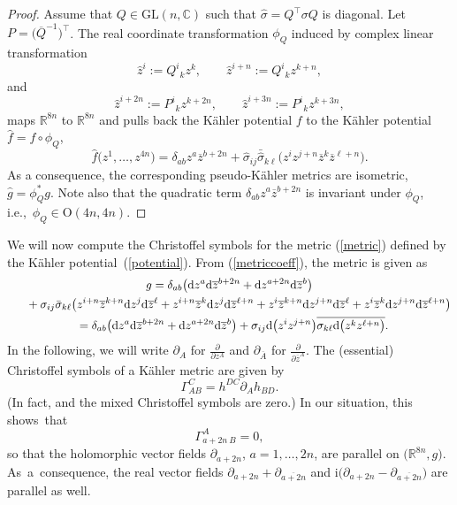 \documentclass[pdftex]{sigma}
\numberwithin{equation}{section}
\newcommand{\C}{\ensuremath{\mathbb{C}}}
\renewcommand{\O}{\ensuremath{\mathrm{O}}}
\newcommand{\GL}{\mathrm{GL}}
\newcommand{\1}{\mathbf{1}}
\renewcommand{\d}{{\mathrm d}}
\newcommand{\ol}{\overline}
\newcommand{\+}{\oplus}
\newcommand{\del}{\partial}
\renewcommand{\=}{\equiv}
\newcommand{\R}{\mathbb{R}}
\begin{document}
\begin{proof}
Assume that $Q\in \GL(n,\C)$ such that $\hat \sigma=Q^\top \sigma Q$ is diagonal. Let $P=\bigl(\overline{Q}^{-1}\bigr)^\top$. The real coordinate transformation $\phi_Q$ induced by complex linear transformation
\[ \hat{z}^{i}:=Q^i{}_k z^{k},\qquad \hat{z}^{i+n}:=Q^i{}_k z^{k+n},\]
and
\[ \hat{z}^{i+2n}:=P^i{}_k z^{k+2n},\qquad {\hat{z}^{i+3n}}:=P^i{}_k z^{k+3n},\]
maps $\R^{8n}$ to $\R^{8n}$ and pulls back the K\"{a}hler potential $f$ to the K\"{a}hler potential $\hat f= f\circ \phi_Q$,
\[
\hat f\bigl({z}^1,\ldots , {z}^{4n}\bigr)
=\delta_{ab} {z}^a\ol{{z}}^{b+2n}+
\hat\sigma_{ij}\bar{\hat\sigma}_{k\ell}
 \bigl(
 {z}^{i}{z}^{j+n}\ol{{z}}^{k} \ol{{z}}^{\ell+n}
 \bigr).
 \]
 As a consequence, the corresponding pseudo-K\"{a}hler metrics are isometric, $\hat g=\phi_Q^*g$. Note also that the quadratic term $\delta_{ab} {z}^a\ol{{z}}^{b+2n}$ is invariant under $\phi_Q$, i.e.,~$\phi_Q\in \O(4n,4n)$.
\end{proof}

We will now compute the Christoffel symbols for the metric (\ref{metric}) defined by the K\"{a}hler potential~(\ref{potential}). From (\ref{metriccoeff}), the metric is given as
\begin{gather}
g =\delta_{ab} \bigl(\d z^a\d \ol{z}^{b+2n} + \d z^{a+2n}\d \ol{z}^{b}\bigr)
\nonumber\\ \hphantom{g=}{}
 +
\sigma_{ij}\bar{\sigma}_{k\ell}
 \bigl(
 z^{i+n}\ol{z}^{k+n}\d z^{j}\d\ol{z}^{\ell}
 +
 z^{i+n}\ol{z}^{k}\d z^{j}\d\ol{z}^{\ell+n}
 +
 z^{i}\ol{z}^{k+n}\d z^{j+n}\d\ol{z}^{\ell}
 +
 z^{i}\ol{z}^{k}\d z^{j+n}\d\ol{z}^{\ell+n}\bigr)
\nonumber\\ \hphantom{g}{}
 =
\delta_{ab} \bigl(\d z^a\d \ol{z}^{b+2n} + \d z^{a+2n}\d \ol{z}^{b}\bigr)
+
 \sigma_{ij} \d\bigl(z^{i} z^{j+n}\bigr)
 \overline{
 \sigma_{k\ell} \d\bigl(z^{k} z^{\ell+n}\bigr)}
.\label{metriclong}
\end{gather}
In the following, we will write $\partial_A$ for $\frac{\partial}{\partial z^A}$ and $\partial_{\overline{A}}$ for $\frac{\partial}{\partial \overline{z}^A}$.
The {(essential)} Christoffel symbols of a K\"{a}hler metric are given by \cite[Section~IX.5]{ko-no2}
\[\Gamma^C_{AB} =h^{DC}\partial_Ah_{BD}.\]
\big(In fact,  and the mixed Christoffel symbols are zero.\big)
In our situation, this shows~that
\[ \Gamma^A_{a+2n\ B}=0,\]
so that the holomorphic vector fields $\del_{a+2n}$, $a=1,\ldots , 2n$, are parallel on $\bigl(\R^{8n}, g\bigr)$. As~a~consequence, the real vector fields
$\del_{a+2n}+\del_{\overline{a+2n}}$ and $\mathrm{i}{\bigl(\del_{a+2n}-\del_{\overline{a+2n}}\bigr)}$ are parallel as well.
\end{document}
